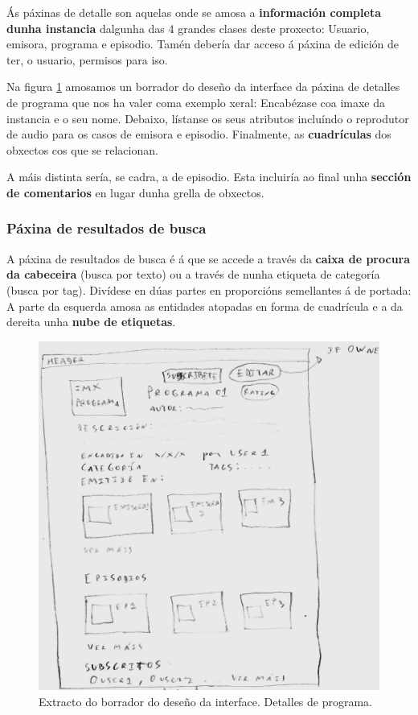 Ás páxinas de detalle son aquelas onde se amosa a \textbf{información completa dunha instancia} dalgunha das 4 grandes clases deste proxecto: Usuario, emisora, programa e episodio. Tamén debería dar acceso á páxina de edición de ter, o usuario, permisos para iso.

Na figura \ref{fig:program1_p} amosamos un borrador do deseño da interface da páxina de detalles de programa que nos ha valer coma exemplo xeral: Encabézase coa imaxe da instancia e o seu nome. Debaixo, lístanse os seus atributos incluíndo o reprodutor de audio para os casos de emisora e episodio. Finalmente, as \textbf{cuadrículas} dos obxectos cos que se relacionan.

A máis distinta sería, se cadra, a de episodio. Esta incluiría ao final unha \textbf{sección de comentarios} en lugar dunha grella de obxectos.


\subsubsection{Páxina de resultados de busca}

A páxina de resultados de busca é á que se accede a través da \textbf{caixa de procura da cabeceira} (busca por texto) ou a través de  nunha etiqueta de categoría (busca por tag). Divídese en dúas partes en proporcións semellantes á de portada: A parte da esquerda amosa as entidades atopadas en forma de cuadrícula e a da dereita unha \textbf{nube de etiquetas}.

\begin{figure}[H]
	\centering
	\includegraphics[scale=0.2,keepaspectratio=true]{./images/program1_p.png}
	\caption{Extracto do borrador do deseño da interface. Detalles de programa.}
	\label{fig:program1_p}
\end{figure}


